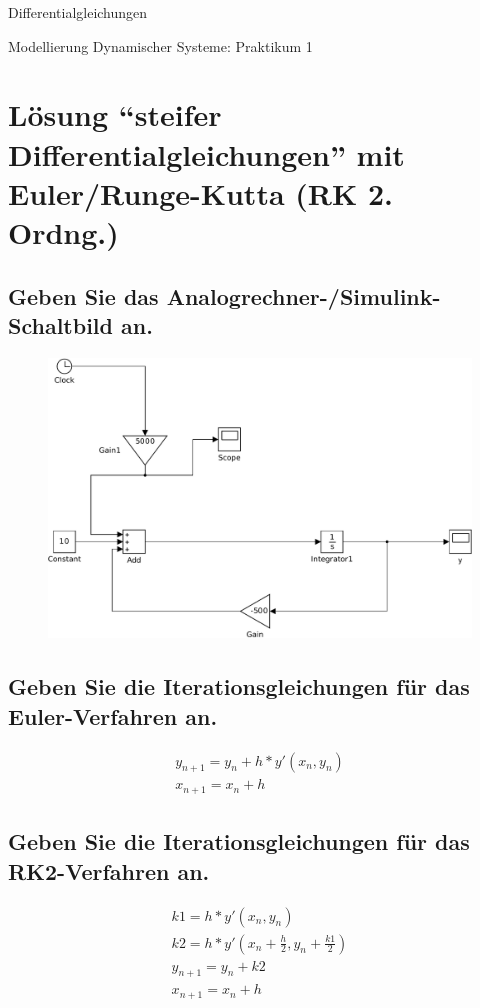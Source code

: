 \documentclass[10pt,a4paper]{article}
\begin{document}
\begin{center}
\begin{LARGE}
Differentialgleichungen
\end{LARGE}

Modellierung Dynamischer Systeme: Praktikum 1

\end{center}

\section{Lösung  "`steifer Differentialgleichungen"' mit Euler/Runge-Kutta (RK 2. Ordng.)}

\subsection{Geben Sie das Analogrechner-/Simulink-Schaltbild an.}
\begin{figure}[H]
\centering
\includegraphics[width=0.9\linewidth]{../screenshots/1}
\end{figure}
\subsection{Geben Sie die Iterationsgleichungen für das Euler-Verfahren an.}
\begin{subequations}
\begin{align}
y_{n+1} = y_n + h * y'(x_n,y_n)\\
x_{n+1} = x_n + h
\end{align}
\end{subequations}

\subsection{Geben Sie die Iterationsgleichungen für das RK2-Verfahren an.}
\begin{subequations}
\begin{align}
k1 = h * y'(x_n,y_n)\\
k2 = h * y'(x_n + \frac{h}{2},y_n + \frac{k1}{2})\\
y_{n+1} = y_n + k2\\
x_{n+1} = x_n + h
\end{align}
\end{subequations}
\end{document}
